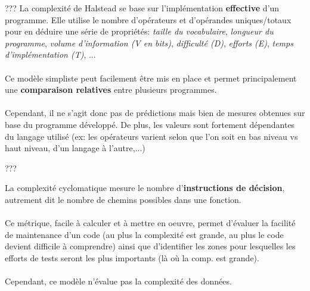 \item{}
{}
{}

\item{}
{}
{}

\item{}
{}
{}

\item{}
{???}
{La complexité de Halstead se base sur l'implémentation \textbf{effective} d'un programme. Elle utilise le nombre d'opérateurs et d'opérandes uniques/totaux pour en déduire une série de propriétés: \textit{taille du vocabulaire}, \textit{longueur du programme}, \textit{volume d'information (V en bits)}, \textit{difficulté (D)}, \textit{efforts (E)}, \textit{temps d'implémentation (T)}, ...}
\paragraph{}
Ce modèle simpliste peut facilement être mis en place et permet principalement une \textbf{comparaison relatives} entre plusieurs programmes.
\paragraph{}
Cependant, il ne s'agit donc pas de prédictions mais bien de mesures obtenues sur base du programme développé. De plus, les valeurs sont fortement dépendantes du langage utilisé (ex: les opérateurs varient selon que l'on soit en bas niveau vs haut niveau, d'un langage à l'autre,...)

\item{}
{???}
{La complexité cyclomatique mesure le nombre d'\textbf{instructions de décision}, autrement dit le nombre de chemins possibles dans une fonction.
\paragraph{}
Ce métrique, facile à calculer et à mettre en oeuvre, permet d'évaluer la facilité de maintenance d'un code (au plus la complexité est grande, au plus le code devient difficile à comprendre) ainsi que d'identifier les zones pour lesquelles les efforts de tests seront les plus importants (là où la comp. est grande).
\paragraph{}
Cependant, ce modèle n'évalue pas la complexité des données.
}
